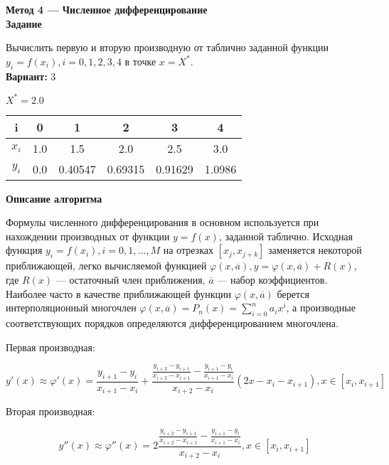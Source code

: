 \textbf{Метод 4 --- Численное дифференцирование}\\

\textbf{Задание}

Вычислить первую и вторую производную от таблично заданной функции $y_i=f(x_i), i=0,1,2,3,4$ в точке $x=X^*$.\\

\textbf{Вариант:} 3

$X^*=2.0$\\
\begin{tabular}{|c|c|c|c|c|c|}
\hline
i & 0 & 1 & 2 & 3 & 4 \\
\hline
$x_i$ & 1.0 & 1.5 & 2.0 & 2.5 & 3.0 \\
\hline
$y_i$ & 0.0 & 0.40547 & 0.69315 & 0.91629 & 1.0986 \\
\hline
\end{tabular}
\vspace{0.5cm}

\textbf{Описание алгоритма}

Формулы численного дифференцирования в основном используется при нахождении производных от функции $y=f(x)$, заданной таблично. Исходная функция $y_i=f(x_i), i=0,1,...,M$ на отрезках $[x_j, x_{j+k}]$ заменяется некоторой приближающей, легко вычисляемой функцией $\varphi(x,\overline{a}), y=\varphi(x,\overline{a})+R(x)$, где $R(x)$ --- остаточный член приближения, $\overline{a}$ --- набор коэффициентов. Наиболее часто в качестве приближающей функции $\varphi(x,\overline{a})$ берется интерполяционный многочлен $\varphi(x,\overline{a})=P_n(x)=\sum\limits_{i=0}^na_ix^i$, а производные соответствующих порядков определяются дифференцированием многочлена.

Первая производная:

$$
y'(x) \approx \varphi'(x)=\frac{y_{i+1}-y_i}{x_{i+1}-x_i}+\frac{\frac{y_{i+2}-y_{i+1}}{x_{i+2}-x_{i+1}}-\frac{y_{i+1}-y_i}{x_{i+1}-x_i}}{x_{i+2}-x_i}(2x-x_i-x_{i+1}), x \in [x_i, x_{i+1}]
$$

Вторая производная:

$$
y''(x) \approx \varphi''(x)=2\frac{\frac{y_{i+2}-y_{i+1}}{x_{i+2}-x_{i+1}}-\frac{y_{i+1}-y_i}{x_{i+1}-x_i}}{x_{i+2}-x_i}, x \in [x_i, x_{i+1}]
$$\\


